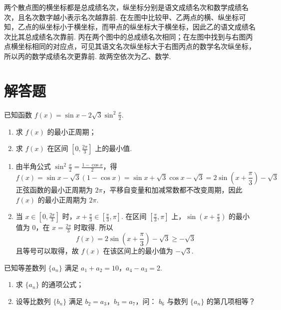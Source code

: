 \begin{solution}
两个散点图的横坐标都是总成绩名次，纵坐标分别是语文成绩名次和数学成绩名次，且名次数字越小表示名次越靠前. 在左图中比较甲、乙两点的横、纵坐标可知，乙点的纵坐标小于横坐标，而甲点的纵坐标大于横坐标，因此乙的语文成绩名次比其总成绩名次靠前. 丙在两个图中的总成绩名次相同；在左图中找到与右图丙点横坐标相同的对应点，可见其语文名次纵坐标大于右图丙点的数学名次纵坐标，所以丙的数学成绩名次更靠前. 故两空依次为乙、数学.
\end{solution}

\section{解答题}

\begin{problem}
已知函数 \( f(x) = \sin x - 2\sqrt{3}\sin^2\frac{x}{2} \).

\begin{enumerate}
\item 求 \( f(x) \) 的最小正周期；
\item 求 \( f(x) \) 在区间 \(\left[0, \frac{2\pi}{3}\right]\) 上的最小值.
\end{enumerate}
\end{problem}

\begin{solution}
\begin{enumerate}
\item 由半角公式 \(\sin^2\frac{x}{2}=\frac{1-\cos x}{2}\)，得
\[
f(x)=\sin x-\sqrt{3}(1-\cos x)=\sin x+\sqrt{3}\cos x-\sqrt{3}=2\sin\left(x+\frac{\pi}{3}\right)-\sqrt{3}
\]
正弦函数的最小正周期为 \(2\pi\)，平移自变量和加减常数都不改变周期，因此 \(f(x)\) 的最小正周期为 \(2\pi\).
\item 当 \(x\in\left[0,\frac{2\pi}{3}\right]\) 时，\(x+\frac{\pi}{3}\in\left[\frac{\pi}{3},\pi\right]\). 在区间 \(\left[\frac{\pi}{3},\pi\right]\) 上，\(\sin\left(x+\frac{\pi}{3}\right)\) 的最小值为 \(0\)，在 \(x=\frac{2\pi}{3}\) 时取得. 所以
\[
f(x)=2\sin\left(x+\frac{\pi}{3}\right)-\sqrt{3}\geq-\sqrt{3}
\]
且等号可以取得，故 \(f(x)\) 在该区间上的最小值为 \(-\sqrt{3}\).
\end{enumerate}
\end{solution}

\begin{problem}
已知等差数列 \(\{a_{n}\}\) 满足 \(a_1 + a_2 = 10\)，\(a_4 - a_3 = 2\).

\begin{enumerate}
\item 求 \(\{a_{n}\}\) 的通项公式；
\item 设等比数列 \(\{b_{n}\}\) 满足 \(b_{2}=a_{3}\)，\(b_{3}=a_{7}\)，问： \(b_{6}\) 与数列 \(\{a_{n}\}\) 的第几项相等？
\end{enumerate}
\end{problem}

